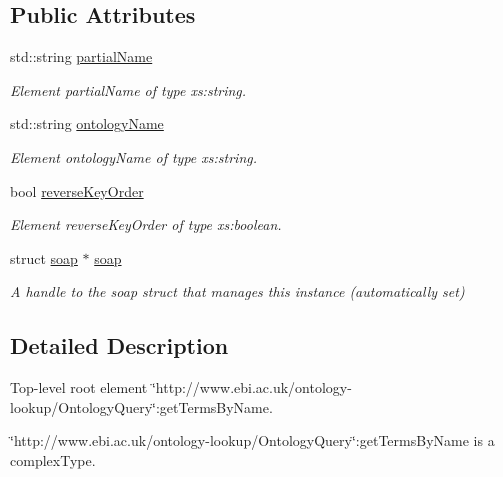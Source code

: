 \subsection*{Public Attributes}
\begin{DoxyCompactItemize}
\item 
std::string \hyperlink{class__ns1____getTermsByName_a5f993bd8bc7b04308f02ba02005b9ab9}{partialName}
\begin{DoxyCompactList}\small\item\em Element partialName of type xs:string. \end{DoxyCompactList}\item 
std::string \hyperlink{class__ns1____getTermsByName_a99ffe00f624540925567b82e0300becc}{ontologyName}
\begin{DoxyCompactList}\small\item\em Element ontologyName of type xs:string. \end{DoxyCompactList}\item 
bool \hyperlink{class__ns1____getTermsByName_a7195613676edeef3542c6f102216fce8}{reverseKeyOrder}
\begin{DoxyCompactList}\small\item\em Element reverseKeyOrder of type xs:boolean. \end{DoxyCompactList}\item 
\hypertarget{class__ns1____getTermsByName_a28143e2720be44178fb1f17c15c1e7e2}{
struct \hyperlink{class__ns1____getTermsByName_a28143e2720be44178fb1f17c15c1e7e2}{soap} $\ast$ \hyperlink{class__ns1____getTermsByName_a28143e2720be44178fb1f17c15c1e7e2}{soap}}
\label{class__ns1____getTermsByName_a28143e2720be44178fb1f17c15c1e7e2}

\begin{DoxyCompactList}\small\item\em A handle to the soap struct that manages this instance (automatically set) \end{DoxyCompactList}\end{DoxyCompactItemize}


\subsection{Detailed Description}
Top-\/level root element \char`\"{}http://www.ebi.ac.uk/ontology-\/lookup/OntologyQuery\char`\"{}:getTermsByName. 

\char`\"{}http://www.ebi.ac.uk/ontology-\/lookup/OntologyQuery\char`\"{}:getTermsByName is a complexType. 

